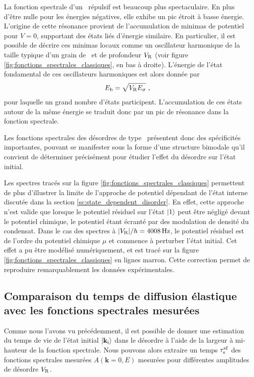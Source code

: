La fonction spectrale d'un \speckle\ répulsif est beaucoup plus spectaculaire. En plus d'être nulle pour les énergies négatives, elle exhibe un pic étroit à basse énergie. L'origine de cette résonance provient de l'accumulation de minimas de potentiel pour $V=0$, supportant des états liés d'énergie similaire\citep{prat2016semiclassical}. En particulier, il est possible de décrire ces minimas locaux comme un oscillateur harmonique de la taille typique d'un grain de \speckle\ et de profondeur $V_{\mathrm{R}}$ (voir figure \ref{fig:fonctions_spectrales_classiques}, en bas à droite). L'énergie de l'état fondamental de ces oscillateurs harmoniques est alors donnée par 
\begin{equation}
E_{\mathrm{b}}=\sqrt{V_{\mathrm{R}}E_{\sigma}} \text{ ,}
\end{equation}
pour laquelle un grand nombre d'états participent. L'accumulation de ces états autour de la même énergie se traduit donc par un pic de résonance dans la fonction spectrale. 

Les fonctions spectrales des désordres de type \speckle\ présentent donc des spécificités importantes, pouvant se manifester sous la forme d'une structure bimodale qu'il convient de déterminer précisément pour étudier l'effet du désordre sur l'état initial. 

Les spectres tracés sur la figure \ref{fig:fonctions_spectrales_classiques} permettent de plus d'illustrer la limite de l'approche de potentiel dépendant de l'état interne discutée dans la section \ref{sc:state_dependent_disorder}. En effet, cette approche n'est valide que lorsque le potentiel résiduel sur l'état $\left| 1 \right\rangle$ peut être négligé devant le potentiel chimique, le potentiel étant écranté par des modulation de densité du condensat. Dans le cas des spectres à $|V_{\mathrm{R}}|/h=\SI{4008}{\hertz}$, le potentiel résiduel est de l'ordre du potentiel chimique $\mu$ et commence à perturber l'état initial. Cet effet a pu être modélisé numériquement, et est tracé sur la figure \ref{fig:fonctions_spectrales_classiques} en lignes marron. Cette correction permet de reproduire remarquablement les données expérimentales.


\subsection{Comparaison du temps de diffusion élastique avec les fonctions spectrales mesurées}
Comme nous l'avons vu précédemment, il est possible de donner une estimation du temps de vie de l'état initial $\left| \mathbf{k}_{\mathrm{i}} \right\rangle$ dans le désordre à l'aide de la largeur à mi-hauteur de la fonction spectrale. Nous pouvons alors extraire un temps $\tau_{\mathrm{s}}^{\mathrm{sf}}$ des fonctions spectrales mesurées $A(\mathbf{k}=0,E)$ mesurées pour différentes amplitudes de désordre $V_{\mathrm{R}}$.

